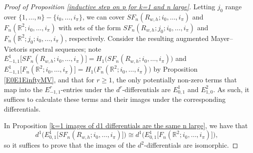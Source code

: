 \documentclass[pagebackref,colorlinks,citecolor=blue,linkcolor=blue,urlcolor=blue,filecolor=blue]{article}
\theoremstyle{definition}\newtheorem{definition}[thm]{Definition}
\theoremstyle{definition}
\newcommand{\R}{\ensuremath{\mathbb{R}}}
\begin{document}
\begin{proof}[Proof of Proposition \ref{inductive step on p for k=1 and n large}]
Letting $j_{0}$ range over $\{1, \dots, n\}-\{i_{0}, \dots, i_{\pi}\}$, we can cover $SF_{n}(R_{w,h}; i_{0}, \dots, i_{\pi})$ and $F_{n}(\R^{2}; i_{0}, \dots, i_{\pi})$ with sets of the form $SF_{n}(R_{w, h}; j_{0}; i_{0}, \dots, i_{\pi})$ and $F_{n}(\R^{2}; j_{0}; i_{0}, \dots, i_{\pi})$, respectively.
Consider the resulting augmented Mayer--Vietoris spectral sequences; note $E^{1}_{-1,1}\big[SF_{n}(R_{w, h};i_{0},\dots, i_{\pi})\big]=H_{1}\big(SF_{n}(R_{w, h};i_{0},\dots, i_{\pi})\big)$ and $E^{1}_{-1,1}\big[F_{n}(\R^{2};i_{0},\dots, i_{\pi})\big]=H_{1}\big(F_{n}(\R^{2};i_{0},\dots, i_{\pi})\big)$ by Proposition \ref{E0E1EinftyMV}, and that for $r\ge 1$, the only potentially non-zero terms that map into the $E^{r}_{-1,1}$-entries under the $d^{r}$-differentials are $E^{1}_{0,1}$ and $E^{2}_{1,0}$.
As such, it suffices to calculate these terms and their images under the corresponding differentials. 

In Proposition \ref{k=1 images of d1 differentials are the same n large}, we have that 
\[
d^{1}\Big(E^{1}_{0,1}\big[SF_{n}(R_{w, h}; i_{0}, \dots, i_{\pi})\big]\Big)\cong d^{1}\Big(E^{1}_{0,1}\big[F_{n}(\R^{2}; i_{0}, \dots, i_{\pi})\big]\Big),
\]
so it suffices to prove that the images of the $d^{2}$-differentials are isomorphic.


\end{proof}
\end{document}
